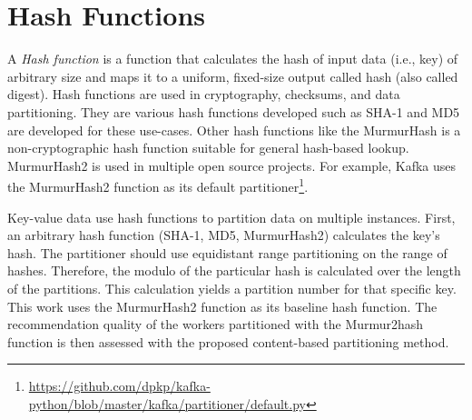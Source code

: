 \section{Hash Functions}
\label{sec:hash-functions}
A \emph{Hash function} is a function that calculates the hash of input data (i.e., key) of arbitrary size and maps it to a uniform, fixed-size output called hash (also called digest). Hash functions are used in cryptography, checksums, and data partitioning. They are various hash functions developed such as SHA-1 \cite{eastlake2001us} and MD5 \cite{rivest1992md5} are developed for these use-cases. Other hash functions like the MurmurHash is a non-cryptographic hash function suitable for general hash-based lookup. MurmurHash2 is used in multiple open source projects. For example, Kafka uses the MurmurHash2 function as its default partitioner\footnote{\url{https://github.com/dpkp/kafka-python/blob/master/kafka/partitioner/default.py}}.


Key-value data use hash functions to partition data on multiple instances. First, an arbitrary hash function (SHA-1, MD5, MurmurHash2) calculates the key's hash. The partitioner should use equidistant range partitioning on the range of hashes. Therefore, the modulo of the particular hash is calculated over the length of the partitions. This calculation yields a partition number for that specific key. This work uses the MurmurHash2 function as its baseline hash function. The recommendation quality of the workers partitioned with the Murmur2hash function is then assessed with the proposed content-based partitioning method.
